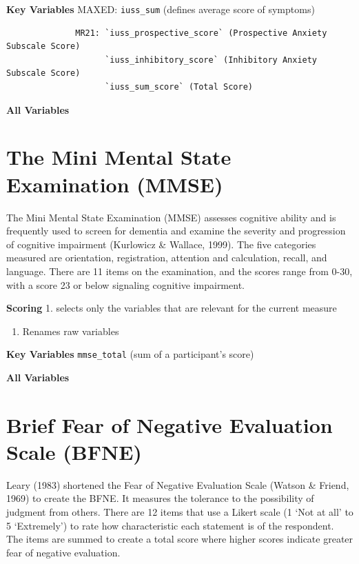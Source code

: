 \documentclass[
]{book}
\providecommand{\tightlist}{%
  \setlength{\itemsep}{0pt}\setlength{\parskip}{0pt}}
\begin{document}
\textbf{Key Variables} MAXED: \texttt{iuss\_sum} (defines average score of symptoms)

\begin{verbatim}
              MR21: `iuss_prospective_score` (Prospective Anxiety Subscale Score)
                    `iuss_inhibitory_score` (Inhibitory Anxiety Subscale Score)
                    `iuss_sum_score` (Total Score)
\end{verbatim}

\textbf{All Variables}

\section{The Mini Mental State Examination (MMSE)}\label{the-mini-mental-state-examination-mmse}

The Mini Mental State Examination (MMSE) assesses cognitive ability and
is frequently used to screen for dementia and examine the severity and
progression of cognitive impairment (Kurlowicz \& Wallace, 1999). The
five categories measured are orientation, registration, attention and
calculation, recall, and language. There are 11 items on the
examination, and the scores range from 0-30, with a score 23 or below
signaling cognitive impairment.

\textbf{Scoring} 1. selects only the variables that are relevant for the
current measure

\begin{enumerate}
\def\labelenumi{\arabic{enumi}.}
\setcounter{enumi}{1}
\tightlist
\item
  Renames raw variables
\end{enumerate}

\textbf{Key Variables} \texttt{mmse\_total} (sum of a participant's score)

\textbf{All Variables}

\section{Brief Fear of Negative Evaluation Scale (BFNE)}\label{brief-fear-of-negative-evaluation-scale-bfne}

Leary (1983) shortened the Fear of Negative Evaluation Scale (Watson \&
Friend, 1969) to create the BFNE. It measures the tolerance to the
possibility of judgment from others. There are 12 items that use a
Likert scale (1 `Not at all' to 5 `Extremely') to rate how
characteristic each statement is of the respondent. The items are summed
to create a total score where higher scores indicate greater fear of
negative evaluation.
\end{document}
